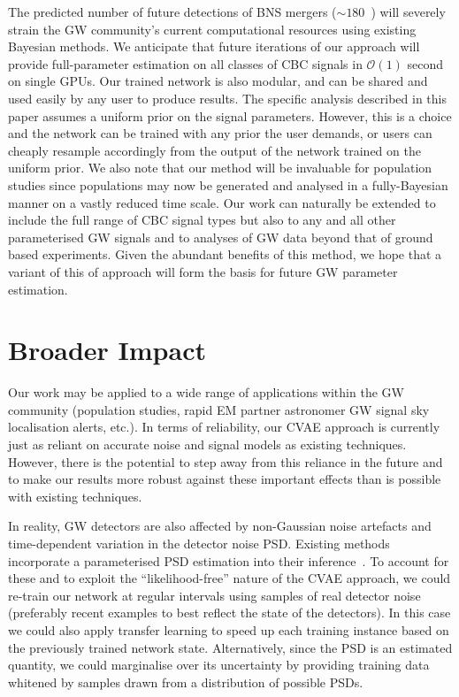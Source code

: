 \documentclass{article}
\begin{document}
%
%
The predicted number of future detections of \ac{BNS} mergers ($\sim
180$~\cite{2018LRR....21....3A}) will severely strain the \ac{GW} community's
current computational resources using existing Bayesian methods. We anticipate
that future iterations of our approach will provide full-parameter estimation
on all classes of \ac{CBC} signals in $\mathcal{O}(1)$ second on single
\acp{GPU}. Our trained network is also modular, and can be shared and used
easily by any user to produce results. The specific analysis described in this
paper assumes a uniform prior on the signal parameters. However, this is a
choice and the network can be trained with any prior the user demands, or users
can cheaply resample accordingly from the output of the network trained on the
uniform prior. We also note that our method will be invaluable for population
studies since populations may now be generated and analysed in a fully-Bayesian
manner on a vastly reduced time scale. Our work can naturally be extended to include the full range of \ac{CBC} signal types but also to any and all other parameterised \ac{GW}
signals and to analyses of \ac{GW} data beyond that of ground based
experiments. Given the abundant benefits of this method, we hope that a variant
of this of approach will form the basis for future \ac{GW} parameter
estimation.


%
%

\section*{Broader Impact}



%
%
Our work may be applied to a wide range of applications within the 
\ac{GW} community (population studies, rapid \ac{EM} partner 
astronomer \ac{GW} signal sky localisation alerts, etc.). In terms of  
reliability, our \ac{CVAE} approach is currently just as 
reliant on accurate noise and signal models as existing techniques. 
However, there is the potential to step away from this reliance in the 
future and to make our results more robust against these important 
effects than is possible with existing techniques.

In reality, \ac{GW} detectors are also affected by non-Gaussian noise artefacts and
time-dependent variation in the detector noise \ac{PSD}. Existing methods
incorporate a parameterised \ac{PSD} estimation into their
inference~\cite{2015PhRvD..91h4034L}. To account for these and to exploit the
``likelihood-free'' nature of the \ac{CVAE} approach, we could re-train our
network at regular intervals using samples of real detector noise (preferably
recent examples to best reflect the state of the detectors). In this case
we could also apply transfer learning to speed up each training instance based
on the previously trained network state.  Alternatively, since the \ac{PSD} is
an estimated quantity, we could marginalise over its uncertainty by providing
training data whitened by samples drawn from a distribution of possible
\acp{PSD}.
\end{document}
